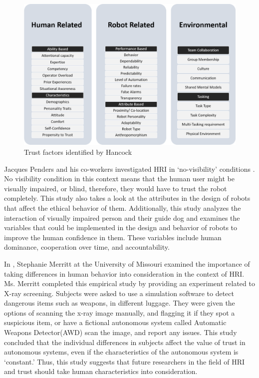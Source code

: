 \documentclass[runningheads,a4paper]{llncs}
\begin{document}
\begin{figure} [h!]
    \centering
        \includegraphics[width=\textwidth]{Figures/TrustFactors.png}
    \caption{Trust factors identified by Hancock \cite{hancock2011meta}}
\end{figure}

\newpage

Jacques Penders and his co-workers investigated HRI in `no-visibility' conditions \cite{penders2013enhancing}. No visibility condition in this context means that the human user might be visually impaired, or blind, therefore, they would have to trust the robot completely. This study also takes a look at the attributes in the design of robots that affect the ethical behavior of them. Additionally, this study analyzes the interaction of visually impaired person and their guide dog and examines the variables that could be implemented in the design and behavior of robots to improve the human confidence in them. These variables include human dominance, cooperation over time, and accountability.

In \cite{merritt2008not}, Stephanie Merritt at the University of Missouri examined the importance of taking differences in human behavior into consideration in the context of HRI. Ms. Merritt completed this empirical study by providing an experiment related to  X-ray screening. Subjects were asked to use a simulation software to detect dangerous items such as weapons, in different luggage. They were given the options of scanning the x-ray image manually, and flagging it if they spot a suspicious item, or have a fictional autonomous system called  Automatic Weapons Detector(AWD) scan the image, and report any issues. This study concluded that the individual differences in subjects affect the value of trust in autonomous systems, even if the characteristics of the autonomous system is `constant.' Thus, this study suggests that future researchers in the field of HRI and trust should take human characteristics into consideration.
\end{document}

